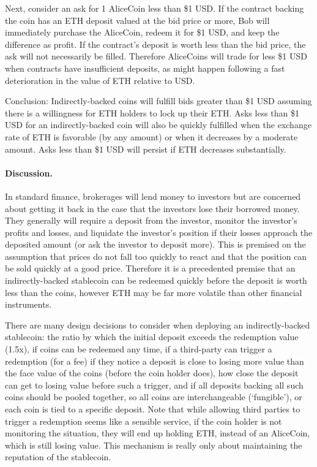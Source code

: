 
Next, consider an ask for 1 AliceCoin less than \$1 USD. If the contract backing the coin has an ETH deposit valued at the bid price or more, Bob will immediately purchase the AliceCoin, redeem it for \$1 USD, and keep the difference as profit. If the contract's deposit is worth less than the bid price, the ask will not necessarily be filled. Therefore AliceCoins will trade for less \$1 USD when contracts have insufficient deposits, as might happen following a fast deterioration in the value of ETH relative to USD.

Conclusion: Indirectly-backed coins will fulfill bids greater than \$1 USD assuming there is a willingness for ETH holders to lock up their ETH. Asks less than \$1 USD for an indirectly-backed coin will also be quickly fulfilled when the exchange rate of ETH is favorable (by any amount) or when it decreases by a moderate amount. Asks less than \$1 USD will persist if ETH decreases substantially.

\paragraph{Discussion.} In standard finance, brokerages will lend money to investors but are concerned about getting it back in the case that the investors lose their borrowed money. They generally will require a deposit from the investor, monitor the investor's profits and losses, and liquidate the investor's position if their losses approach the deposited amount (or ask the investor to deposit more). This is premised on the assumption that prices do not fall too quickly to react and that the position can be sold quickly at a good price. Therefore it is a precedented premise that an indirectly-backed stablecoin can be redeemed quickly before the deposit is worth less than the coins, however ETH may be far more volatile than other financial instruments.

There are many design decisions to consider when deploying an indirectly-backed stablecoin: the ratio by which the initial deposit exceeds the redemption value (\eg 1.5x), if coins can be redeemed any time, if a third-party can trigger a redemption (\eg for a fee) if they notice a deposit is close to losing more value than the face value of the coins (before the coin holder does), how close the deposit can get to losing value before such a trigger, and if all deposits backing all such coins should be pooled together, so all coins are interchangeable (`fungible'), or each coin is tied to a specific deposit. Note that while allowing third parties to trigger a redemption seems like a sensible service, if the coin holder is not monitoring the situation, they will end up holding ETH, instead of an AliceCoin, which is still losing value. This mechanism is really only about maintaining the reputation of the stablecoin.

